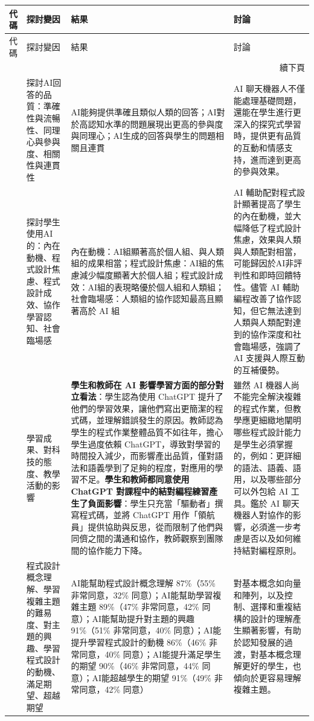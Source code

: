 \begingroup
\small
\setlength{\tabcolsep}{3pt}
\begin{longtable}{@{}p{} p{} p{} p{}@{}}
\toprule
代碼 & 探討變因 & 結果 & 討論 \\
\midrule
\endfirsthead
\toprule
代碼 & 探討變因 & 結果 & 討論 \\
\midrule
\endhead
\midrule
\multicolumn{4}{r}{續下頁} \\
\endfoot
\bottomrule
\endlastfoot
\cite{cao2023chatbots} & 探討AI回答的品質：準確性與流暢性、同理心與參與度、相關性與連貫性 & AI能夠提供準確且類似人類的回答；AI對於高認知水準的問題展現出更高的參與度與同理心；AI生成的回答與學生的問題相關且連貫 & AI 聊天機器人不僅能處理基礎問題，還能在學生進行更深入的探究式學習時，提供更有品質的互動和情感支持，進而達到更高的參與效果。 \\
\cite{fan2025pair} & 探討學生使用AI的：內在動機、程式設計焦慮、程式設計成效、協作學習認知、社會臨場感 & 內在動機：AI組顯著高於個人組、與人類組的成果相當；程式設計焦慮：AI組的焦慮減少幅度顯著大於個人組；程式設計成效：AI組的表現略優於個人組和人類組；社會臨場感：人類組的協作認知最高且顯著高於 AI 組 & AI 輔助配對程式設計顯著提高了學生的內在動機，並大幅降低了程式設計焦慮，效果與人類與人類配對相當，可能歸因於AI非評判性和即時回饋特性。儘管 AI 輔助編程改善了協作認知，但它無法達到人類與人類配對達到的協作深度和社會臨場感，強調了 AI 支援與人際互動的互補優勢。 \\
\cite{groothuijsen2024chatbots} & 學習成果、對科技的態度、教學活動的影響 & \textbf{學生和教師在 AI 影響學習方面的部分對立看法}：學生認為使用 ChatGPT 提升了他們的學習效果，讓他們寫出更簡潔的程式碼，並理解錯誤發生的原因。教師認為學生的程式作業整體品質不如往年，擔心學生過度依賴 ChatGPT，導致對學習的時間投入減少，而影響產出品質，僅對語法和語義學到了足夠的程度，對應用的學習不足。\textbf{學生和教師都同意使用 ChatGPT 對課程中的結對編程練習產生了負面影響}：學生只充當「驅動者」撰寫程式碼，並將 ChatGPT 用作「領航員」提供協助與反思，從而限制了他們與同儕之間的溝通和協作，教師觀察到團隊間的協作能力下降。 & 雖然 AI 機器人尚不能完全解決複雜的程式作業，但教學應更細緻地闡明哪些程式設計能力是學生必須掌握的，例如：更詳細的語法、語義、語用，以及哪些部分可以外包給 AI 工具。鑑於 AI 聊天機器人對協作的影響，必須進一步考慮是否以及如何維持結對編程原則。 \\
\cite{llerena2024introductory} & 程式設計概念理解、學習複雜主題的難易度、對主題的興趣、學習程式設計的動機、滿足期望、超越期望 & AI能幫助程式設計概念理解 87\%（55\% 非常同意，32\% 同意）；AI能幫助學習複雜主題 89\%（47\% 非常同意，42\% 同意）；AI能幫助提升對主題的興趣 91\%（51\% 非常同意，40\% 同意）；AI能提升學習程式設計的動機 86\%（46\% 非常同意，40\% 同意）；AI能提升滿足學生的期望 90\%（46\% 非常同意，44\% 同意）；AI能超越學生的期望 91\%（49\% 非常同意，42\% 同意） & 對基本概念如向量和陣列，以及控制、選擇和重複結構的設計的理解產生顯著影響，有助於認知發展的過渡，對基本概念理解更好的學生，也傾向於更容易理解複雜主題。 \\

\end{longtable}
